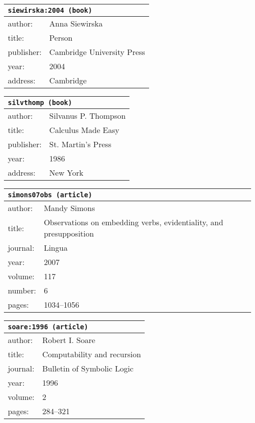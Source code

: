 \documentclass{article}
\begin{document}
\bigskip

\begin{tabular}{p{}p{}}
\multicolumn{2}{l}{\texttt{siewirska:2004 (book)}}\\
\hline
author: & Anna Siewirska\\
title: & Person\\
publisher: & Cambridge University Press\\
year: & 2004\\
address: & Cambridge\\
\end{tabular}

\bigskip

\begin{tabular}{p{}p{}}
\multicolumn{2}{l}{\texttt{silvthomp (book)}}\\
\hline
author: & Silvanus P. Thompson\\
title: & Calculus Made Easy\\
publisher: & St. Martin's Press\\
year: & 1986\\
address: & New York\\
\end{tabular}

\bigskip

\begin{tabular}{p{}p{}}
\multicolumn{2}{l}{\texttt{simons07obs (article)}}\\
\hline
author: & Mandy Simons\\
title: & Observations on embedding verbs, evidentiality, and presupposition\\
journal: & Lingua\\
year: & 2007\\
volume: & 117\\
number: & 6\\
pages: & 1034--1056\\
\end{tabular}

\bigskip

\begin{tabular}{p{}p{}}
\multicolumn{2}{l}{\texttt{soare:1996 (article)}}\\
\hline
author: & Robert I. Soare\\
title: & Computability and recursion\\
journal: & Bulletin of Symbolic Logic\\
year: & 1996\\
volume: & 2\\
pages: & 284--321\\
\end{tabular}
\end{document}
